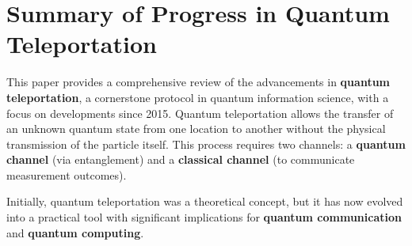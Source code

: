 \documentclass[paper=a4, fontsize=11pt]{scrartcl} %
\title{	
	\normalfont \normalsize 
	\textsc{} \ [25pt] %
	\horrule{0.5pt} \[0.4cm] %
	\huge FYST85 - HANDIN 1 \ %
	\horrule{2pt} \[0.5cm] %
}
\author{Lukas Nord}
\numberwithin{figure}{section} %
\numberwithin{table}{section} %
\begin{document}
\section*{Summary of Progress in Quantum Teleportation}

This paper provides a comprehensive review of the advancements in \textbf{quantum teleportation}, a cornerstone protocol in quantum information science, with a focus on developments since 2015. Quantum teleportation allows the transfer of an unknown quantum state from one location to another without the physical transmission of the particle itself. This process requires two channels: a \textbf{quantum channel} (via entanglement) and a \textbf{classical channel} (to communicate measurement outcomes).

Initially, quantum teleportation was a theoretical concept, but it has now evolved into a practical tool with significant implications for \textbf{quantum communication} and \textbf{quantum computing}.
\end{document}

